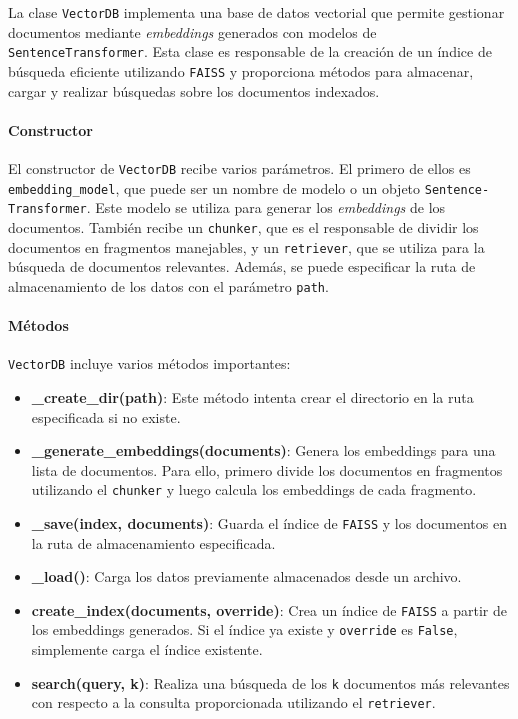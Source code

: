 \documentclass[12pt,letterpaper]{article}
\begin{document}
La clase \texttt{VectorDB} implementa una base de datos vectorial que permite gestionar documentos mediante \textit{embeddings} generados con modelos de \texttt{SentenceTransformer}. Esta clase es responsable de la creación de un índice de búsqueda eficiente utilizando \texttt{FAISS} y proporciona métodos para almacenar, cargar y realizar búsquedas sobre los documentos indexados.

\paragraph{Constructor}

El constructor de \texttt{VectorDB} recibe varios parámetros. El primero de ellos es \texttt{embedding\_model}, que puede ser un nombre de modelo o un objeto \texttt{Sentence-Transformer}. Este modelo se utiliza para generar los \textit{embeddings} de los documentos. También recibe un \texttt{chunker}, que es el responsable de dividir los documentos en fragmentos manejables, y un \texttt{retriever}, que se utiliza para la búsqueda de documentos relevantes. Además, se puede especificar la ruta de almacenamiento de los datos con el parámetro \texttt{path}.

\paragraph{Métodos}

\texttt{VectorDB} incluye varios métodos importantes:

\begin{itemize}
    \item \textbf{\_create\_dir(path)}: Este método intenta crear el directorio en la ruta especificada si no existe.
    \item \textbf{\_generate\_embeddings(documents)}: Genera los embeddings para una lista de documentos. Para ello, primero divide los documentos en fragmentos utilizando el \texttt{chunker} y luego calcula los embeddings de cada fragmento.
    \item \textbf{\_save(index, documents)}: Guarda el índice de \texttt{FAISS} y los documentos en la ruta de almacenamiento especificada.
    \item \textbf{\_load()}: Carga los datos previamente almacenados desde un archivo.
    \item \textbf{create\_index(documents, override)}: Crea un índice de \texttt{FAISS} a partir de los embeddings generados. Si el índice ya existe y \texttt{override} es \texttt{False}, simplemente carga el índice existente.
    \item \textbf{search(query, k)}: Realiza una búsqueda de los \texttt{k} documentos más relevantes con respecto a la consulta proporcionada utilizando el \texttt{retriever}.
\end{itemize}
\end{document}
